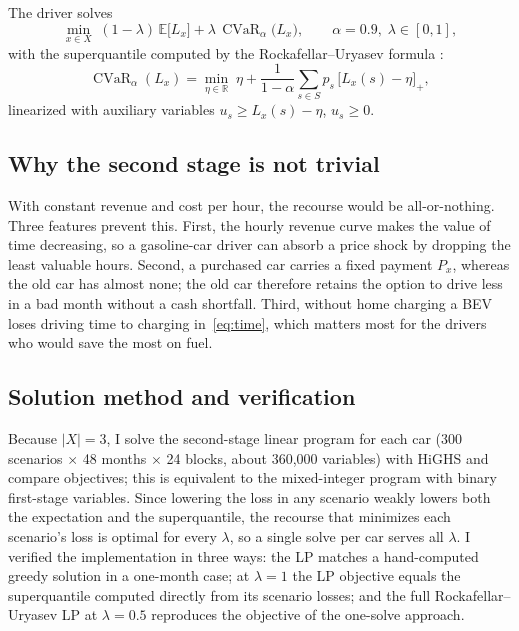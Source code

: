\documentclass[11pt]{article}
\newcommand{\E}{\mathbb{E}}
\newcommand{\CVaR}{\operatorname{CVaR}}
\begin{document}
The driver solves
\begin{equation}\label{eq:obj}
\min_{x \in X}\; (1-\lambda)\, \E\big[L_x\big] + \lambda\, \CVaR_\alpha\big(L_x\big), \qquad \alpha = 0.9,\; \lambda \in [0,1],
\end{equation}
with the superquantile computed by the Rockafellar--Uryasev formula \citep{rockafellar2000}:
\begin{equation}\label{eq:ru}
\CVaR_\alpha(L_x) = \min_{\eta \in \mathbb{R}}\; \eta + \frac{1}{1-\alpha}\sum_{s \in S} p_s\, \big[L_x(s) - \eta\big]_+ ,
\end{equation}
linearized with auxiliary variables $u_s \geq L_x(s) - \eta$, $u_s \geq 0$.

\subsection{Why the second stage is not trivial}

With constant revenue and cost per hour, the recourse would be all-or-nothing. Three features prevent this. First, the hourly revenue curve makes the value of time decreasing, so a gasoline-car driver can absorb a price shock by dropping the least valuable hours. Second, a purchased car carries a fixed payment $P_x$, whereas the old car has almost none; the old car therefore retains the option to drive less in a bad month without a cash shortfall. Third, without home charging a BEV loses driving time to charging in~\eqref{eq:time}, which matters most for the drivers who would save the most on fuel.

\subsection{Solution method and verification}

Because $|X| = 3$, I solve the second-stage linear program for each car (300 scenarios $\times$ 48 months $\times$ 24 blocks, about 360{,}000 variables) with HiGHS \citep{huangfu2018} and compare objectives; this is equivalent to the mixed-integer program with binary first-stage variables. Since lowering the loss in any scenario weakly lowers both the expectation and the superquantile, the recourse that minimizes each scenario's loss is optimal for every $\lambda$, so a single solve per car serves all $\lambda$. I verified the implementation in three ways: the LP matches a hand-computed greedy solution in a one-month case; at $\lambda = 1$ the LP objective equals the superquantile computed directly from its scenario losses; and the full Rockafellar--Uryasev LP at $\lambda = 0.5$ reproduces the objective of the one-solve approach.
\end{document}
